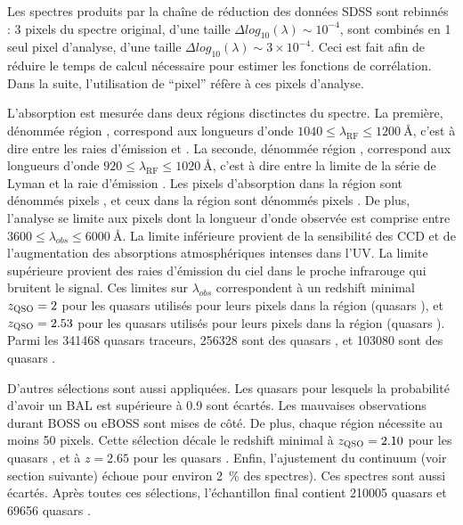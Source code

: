 \documentclass[11pt, twoside, a4paper, openright]{report}
\begin{document}
Les spectres produits par la chaîne de réduction des données SDSS sont rebinnés : 3 pixels du spectre original, d'une taille $\Delta log_{10}(\lambda) \sim 10^{-4}$, sont combinés en 1 seul pixel d'analyse, d'une taille $\Delta log_{10}(\lambda) \sim 3 \times 10^{-4}$. Ceci est fait afin de réduire le temps de calcul nécessaire pour estimer les fonctions de corrélation. Dans la suite, l'utilisation de ``pixel'' réfère à ces pixels d'analyse.

L'absorption \lya{} est mesurée dans deux régions disctinctes du spectre. La première, dénommée région \lya{}, correspond aux longueurs d'onde $\num{1040} \leq \lambda_{\mathrm{RF}} \leq \SI{1200}{\angstrom}$, c'est à dire entre les raies d'émission \lyb{} et \lya{}. La seconde, dénommée région \lyb{}, correspond aux longueurs d'onde $\num{920} \leq \lambda_{\mathrm{RF}} \leq \SI{1020}{\angstrom}$, c'est à dire entre la limite de la série de Lyman et la raie d'émission \lyb{}. Les pixels d'absorption \lya{} dans la région \lya{} sont dénommés pixels \lyalya{}, et ceux dans la région \lyb{} sont dénommés pixels \lyalyb{}.
De plus, l'analyse se limite aux pixels dont la longueur d'onde observée est comprise entre $\num{3600} \leq \lambda_{obs} \leq \SI{6000}{\angstrom}$.
La limite inférieure provient de la sensibilité des CCD et de l'augmentation des absorptions atmosphériques intenses dans l'UV. La limite supérieure provient des raies d'émission du ciel dans le proche infrarouge qui bruitent le signal.
Ces limites sur $\lambda_{obs}$ correspondent à un redshift minimal $z_{\textsc{QSO}} = 2$ pour les quasars utilisés pour leurs pixels dans la région \lya{} (quasars \lya{}), et $z_{\textsc{QSO}} = 2.53$ pour les quasars utilisés pour leurs pixels dans la région \lyb{} (quasars \lyb{}). Parmi les \num{341468} quasars traceurs, \num{256328} sont des quasars \lya{}, et \num{103080} sont des quasars \lyb{}.

D'autres sélections sont aussi appliquées. Les quasars pour lesquels la probabilité d'avoir un BAL est supérieure à 0.9 sont écartés. Les mauvaises observations durant BOSS ou eBOSS sont mises de côté. De plus, chaque région nécessite au moins 50 pixels. Cette sélection décale le redshift minimal à $z_{\textsc{QSO}} = 2.10$ pour les quasars \lya{}, et à $z = 2.65$ pour les quasars \lyb{}. Enfin, l'ajustement du continuum (voir section suivante) échoue pour environ \SI{2}{\percent} des spectres). Ces spectres sont aussi écartés.
Après toutes ces sélections, l'échantillon final contient \num{210005} quasars \lya{} et \num{69656} quasars \lyb{}. 
\end{document}
